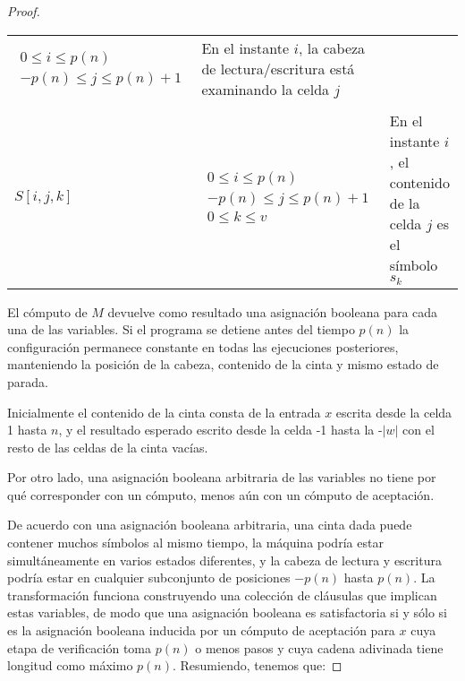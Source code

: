 \documentclass[a4paper, spanish, utf8]{memoir}
\begin{document}
\begin{proof}
\begin{table}[!ht]
\begin{center}
{\begin{tabular}{@{}C{.15\textwidth}C{.25\textwidth}L{.45\textwidth}@{}}
  \begin{minipage}{.24\textwidth} %
  \centering
    \begin{math} %
      \begin{array}{c} %
          0 \le i\le p(n) \\ %
          -p(n) \le j \le p(n) + 1 %
        \end{array}%
    \end{math} %
  \end{minipage} & En el instante $i$, la cabeza de lectura/escritura está examinando la celda $j$\\ \\
$S[i,j,k]$       &

  \begin{minipage}{.24\textwidth} %
  \centering
    \begin{math} %
      \begin{array}{c} %
          0 \le i\le p(n) \\ %
           -p(n) \le j \le p(n) + 1 \\ %
           0 \le k \le v
        \end{array}%
    \end{math} %
  \end{minipage} & En el instante $i$, el contenido de la celda $j$ es el símbolo $s_k$\\
\bottomrule
      \end{tabular}
    }
  \end{center}
\end{table}


El cómputo de $M$ devuelve como resultado una asignación booleana para cada una de las variables. Si el programa se detiene antes del tiempo $p(n)$ la configuración permanece constante en todas las ejecuciones posteriores, manteniendo la posición de la cabeza, contenido de la cinta y mismo estado de parada.

Inicialmente el contenido de la cinta consta de la entrada $x$ escrita desde la celda 1 hasta $n$, y el resultado esperado escrito desde la celda -1 hasta la -$|w|$ con el resto de las celdas de la cinta vacías.

Por otro lado, una asignación booleana arbitraria de las variables no tiene por qué corresponder con un cómputo, menos aún con un cómputo de aceptación. 

De acuerdo con una asignación booleana arbitraria, una cinta dada puede contener muchos símbolos al mismo tiempo, la máquina podría estar simultáneamente en varios estados diferentes, y la cabeza de lectura y escritura podría estar en cualquier subconjunto de posiciones $-p(n)$ hasta $p(n)$. La transformación funciona construyendo una colección de cláusulas que implican estas variables, de modo que una asignación booleana es satisfactoria si y sólo si es la asignación booleana inducida por un cómputo de aceptación para $x$ cuya etapa de verificación toma $p(n)$ o menos pasos y cuya cadena adivinada tiene longitud como máximo $p(n)$. Resumiendo, tenemos que: 


\end{proof}
\end{document}
